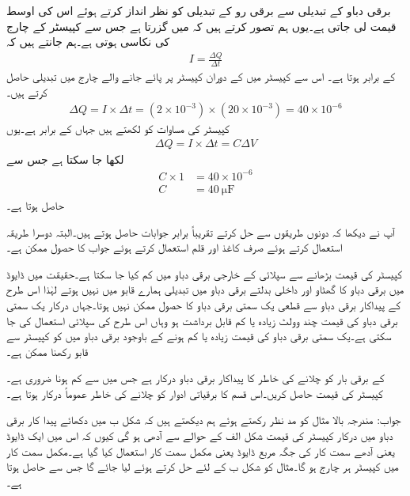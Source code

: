 برقی دباو کے تبدیلی سے برقی رو کے تبدیلی کو نظر انداز کرتے ہوئے اس کی اوسط قیمت لی جاتی ہے۔یوں ہم تصور کرتے ہیں کہ  میں  گزرتا ہے جس سے کپیسٹر کے چارج کی نکاسی ہوتی ہے۔ہم جانتے ہیں کہ
\begin{align*}
I=\frac{\Delta Q}{\Delta t}
\end{align*}
کے برابر ہوتا ہے۔ اس سے کپیسٹر میں   کے دوران کپیسٹر پر پائے جانے والے چارج میں تبدیلی  حاصل کرتے ہیں۔
\begin{align*}
\Delta Q=I \times \Delta t=\left(2 \times 10^{-3} \right) \times \left(20 \times 10^{-3} \right)=40 \times 10^{-6}
\end{align*}
کپیسٹر کی مساوات  کو  لکھتے ہیں جہاں  کے برابر ہے۔یوں
\begin{align*}
\Delta Q=I \times \Delta t=C \Delta V
\end{align*}
لکھا جا سکتا ہے جس سے
\begin{align*}
C \times 1&=40 \times 10^{-6}\\
C&=\SI{40}{\micro \farad}
\end{align*}
حاصل ہوتا ہے۔

آپ نے دیکھا کہ دونوں طریقوں سے حل کرتے تقریباً برابر جوابات حاصل ہوتے ہیں۔البتہ دوسرا طریقہ استعمال کرتے ہوئے صرف کاغذ اور قلم استعمال کرتے ہوئے جواب کا حصول ممکن ہے۔

کپیسٹر کی قیمت بڑھانے سے سپلائی کے خارجی برقی دباو میں  کم کیا جا سکتا ہے۔حقیقت میں ڈایوڈ میں برقی دباو کا گھٹاو اور داخلی بدلتے برقی دباو میں تبدیلی ہمارے قابو میں نہیں ہوتے لہٰذا اس طرح کے پیداکار برقی دباو سے قطعی یک سمتی برقی دباو کا حصول ممکن نہیں ہوتا۔جہاں درکار یک سمتی برقی دباو کی  قیمت چند وولٹ زیادہ یا کم  قابل برداشت ہو وہاں اس طرح کی سپلائی استعمال کی جا سکتی ہے۔یک سمتی برقی دباو کی قیمت زیادہ یا کم ہونے کے باوجود برقی دباو میں  کو کپیسٹر سے قابو رکھنا ممکن ہے۔


 کے برقی بار کو چلانے کی خاطر  کا پیداکار برقی دباو درکار ہے جس میں   سے کم ہونا ضروری ہے۔کپیسٹر کی قیمت حاصل کریں۔اس قسم کا  برقیاتی ادوار کو چلانے کی خاطر عموماً درکار ہوتا ہے۔

جواب: 
مندرجہ بالا مثال کو مد نظر رکھتے ہوئے ہم دیکھتے ہیں کہ شکل  ب میں دکھائے پیدا کار برقی دباو میں درکار کپیسٹر کی قیمت شکل  الف کے حوالے سے آدھی ہو گی کیوں کہ اس میں ایک ڈایوڈ یعنی آدھے سمت کار کی جگہ مربع ڈایوڈ یعنی مکمل سمت کار استعمال کیا گیا ہے۔مکمل سمت کار میں کپیسٹر ہر  چارج ہو گا۔مثال  کو شکل  ب کے لئے حل کرتے ہوئے  لیا جائے گا جس سے  حاصل ہوتا ہے۔ 
 
